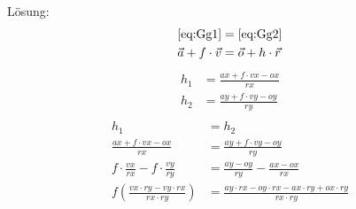 \documentclass[reducespace,stylepage,semiarbeit]{spezidoc}
\begin{document}
Lösung:
\begin{equation*}
\begin{split}
\ref{eq:Gg1} &= \ref{eq:Gg2} \\ 
\vec{a} + f \cdot \vec{v} &= \vec{o} + h \cdot \vec{r}
\end{split}
\end{equation*}
\begin{equation*}
\begin{split}
h_1 &= \frac{ax + f \cdot vx - ox}{rx} \\
h_2 &= \frac{ay + f \cdot vy - oy}{ry} \\
\end{split}
\end{equation*}
\begin{equation*}
\begin{split}
h_1 &= h_2 \\
\frac{ax + f \cdot vx - ox}{rx} &= \frac{ay + f \cdot vy - oy}{ry} \\
f \cdot \frac{vx}{rx} - f \cdot \frac{vy}{ry} &= \frac{ay - oy}{ry} - \frac{ax - ox}{rx} \\
f(\frac{vx \cdot ry - vy \cdot rx}{rx \cdot ry}) &= \frac{ay \cdot rx - oy \cdot rx - ax \cdot ry + ox \cdot ry}{rx \cdot ry} 
\end{split}
\end{equation*}
\end{document}
